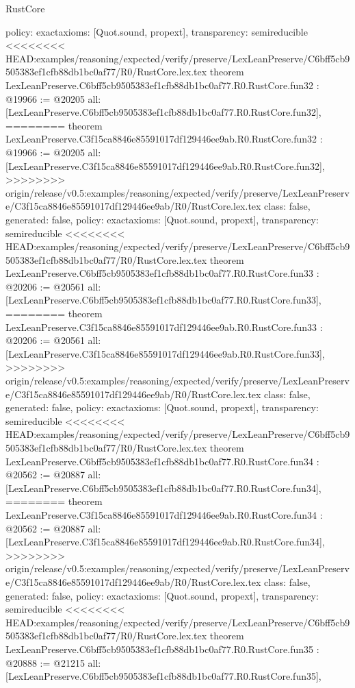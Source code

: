 \begin{lexlean}{RustCore}
\begin{coremodule}
{\begin{coremodule}
{{{{{{{{{{{{{{{{{{{{{{{{{{{{{{{{{{{  policy: exact{axioms: [Quot.sound, propext]},
  transparency: semireducible
}
<<<<<<<< HEAD:examples/reasoning/expected/verify/preserve/LexLeanPreserve/C6bff5cb9505383ef1cfb88db1bc0af77/R0/RustCore.lex.tex
theorem LexLeanPreserve.C6bff5cb9505383ef1cfb88db1bc0af77.R0.RustCore.fun32 : @19966 := @20205 {
  all: [LexLeanPreserve.C6bff5cb9505383ef1cfb88db1bc0af77.R0.RustCore.fun32],
========
theorem LexLeanPreserve.C3f15ca8846e85591017df129446ee9ab.R0.RustCore.fun32 : @19966 := @20205 {
  all: [LexLeanPreserve.C3f15ca8846e85591017df129446ee9ab.R0.RustCore.fun32],
>>>>>>>> origin/release/v0.5:examples/reasoning/expected/verify/preserve/LexLeanPreserve/C3f15ca8846e85591017df129446ee9ab/R0/RustCore.lex.tex
  class: false,
  generated: false,
  policy: exact{axioms: [Quot.sound, propext]},
  transparency: semireducible
}
<<<<<<<< HEAD:examples/reasoning/expected/verify/preserve/LexLeanPreserve/C6bff5cb9505383ef1cfb88db1bc0af77/R0/RustCore.lex.tex
theorem LexLeanPreserve.C6bff5cb9505383ef1cfb88db1bc0af77.R0.RustCore.fun33 : @20206 := @20561 {
  all: [LexLeanPreserve.C6bff5cb9505383ef1cfb88db1bc0af77.R0.RustCore.fun33],
========
theorem LexLeanPreserve.C3f15ca8846e85591017df129446ee9ab.R0.RustCore.fun33 : @20206 := @20561 {
  all: [LexLeanPreserve.C3f15ca8846e85591017df129446ee9ab.R0.RustCore.fun33],
>>>>>>>> origin/release/v0.5:examples/reasoning/expected/verify/preserve/LexLeanPreserve/C3f15ca8846e85591017df129446ee9ab/R0/RustCore.lex.tex
  class: false,
  generated: false,
  policy: exact{axioms: [Quot.sound, propext]},
  transparency: semireducible
}
<<<<<<<< HEAD:examples/reasoning/expected/verify/preserve/LexLeanPreserve/C6bff5cb9505383ef1cfb88db1bc0af77/R0/RustCore.lex.tex
theorem LexLeanPreserve.C6bff5cb9505383ef1cfb88db1bc0af77.R0.RustCore.fun34 : @20562 := @20887 {
  all: [LexLeanPreserve.C6bff5cb9505383ef1cfb88db1bc0af77.R0.RustCore.fun34],
========
theorem LexLeanPreserve.C3f15ca8846e85591017df129446ee9ab.R0.RustCore.fun34 : @20562 := @20887 {
  all: [LexLeanPreserve.C3f15ca8846e85591017df129446ee9ab.R0.RustCore.fun34],
>>>>>>>> origin/release/v0.5:examples/reasoning/expected/verify/preserve/LexLeanPreserve/C3f15ca8846e85591017df129446ee9ab/R0/RustCore.lex.tex
  class: false,
  generated: false,
  policy: exact{axioms: [Quot.sound, propext]},
  transparency: semireducible
}
<<<<<<<< HEAD:examples/reasoning/expected/verify/preserve/LexLeanPreserve/C6bff5cb9505383ef1cfb88db1bc0af77/R0/RustCore.lex.tex
theorem LexLeanPreserve.C6bff5cb9505383ef1cfb88db1bc0af77.R0.RustCore.fun35 : @20888 := @21215 {
  all: [LexLeanPreserve.C6bff5cb9505383ef1cfb88db1bc0af77.R0.RustCore.fun35],
}}}}}}}}}}}}}}}}}}}}}}}}}}}}}}}}}}}}}}
\end{coremodule}}
\end{coremodule}
\end{lexlean}
